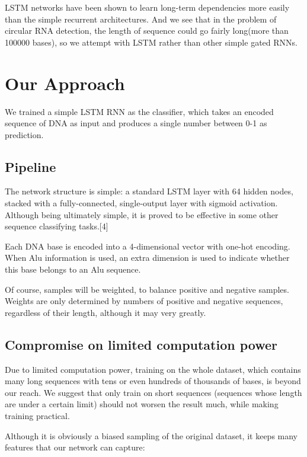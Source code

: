 \documentclass[10pt,a4paper]{article}
\begin{document}
\begin{spacing}{1.5}
LSTM networks have been shown to learn long-term dependencies more easily than the simple recurrent architectures. And we see that in the problem of circular RNA detection, the length of sequence could go fairly long(more than 100000 bases), so we attempt with LSTM rather than other simple gated RNNs.

\section{Our Approach}

We trained a simple LSTM RNN as the classifier, which takes an encoded sequence of DNA as input and produces a single number between 0-1 as prediction.

\subsection{Pipeline}

The network structure is simple: a standard LSTM layer with 64 hidden nodes, stacked with a fully-connected, single-output layer with sigmoid activation. Although being ultimately simple, it is proved to be effective in some other sequence classifying tasks.[4] 

Each DNA base is encoded into a 4-dimensional vector with one-hot encoding. When Alu information is used, an extra dimension is used to indicate whether this base belongs to an Alu sequence.

Of course, samples will be weighted, to balance positive and negative samples. Weights are only determined by numbers of positive and negative sequences, regardless of their length, although it may very greatly.

\subsection{Compromise on limited computation power}

Due to limited computation power, training on the whole dataset, which contains many long sequences with tens or even hundreds of thousands of bases, is beyond our reach. We suggest that only train on short sequences (sequences whose length are under a certain limit) should not worsen the result much, while making training practical.

Although it is obviously a biased sampling of the original dataset, it keeps many features that our network can capture:

\begin{itemize}


\end{itemize}
\end{spacing}
\end{document}
